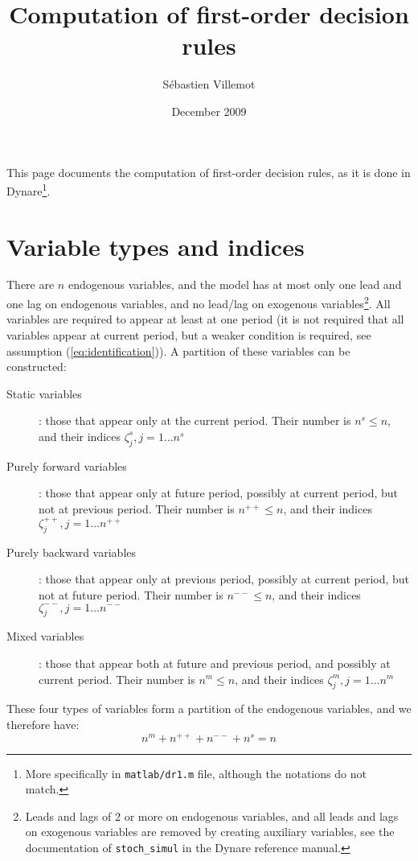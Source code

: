 \documentclass[11pt,a4paper]{article}
\begin{document}
\author{S\'ebastien Villemot}
\title{Computation of first-order decision rules}
\date{December 2009}
\maketitle

This page documents the computation of first-order decision rules, as it is done in Dynare\footnote{More specifically in \texttt{matlab/dr1.m} file, although the notations do not match.}.

\section{Variable types and indices}

There are $n$ endogenous variables, and the model has at most only one lead and one lag on endogenous variables, and no lead/lag on exogenous variables\footnote{Leads and lags of 2 or more on endogenous variables, and all leads and lags on exogenous variables are removed by creating auxiliary variables, see the documentation of \texttt{stoch\_simul} in the Dynare reference manual.}. All variables are required to appear at least at one period (it is not required that all variables appear at current period, but a weaker condition is required, see assumption (\ref{eq:identification})). A partition of these variables can be constructed:
\begin{description}
\item[Static variables]: those that appear only at the current period. Their number is $n^s \leq n$, and their indices $\zeta^s_j, j=1\ldots n^s$
\item[Purely forward variables]: those that appear only at future period, possibly at current period, but not at previous period. Their number is $n^{++} \leq n$, and their indices $\zeta^{++}_j, j=1\ldots n^{++}$
\item[Purely backward variables]: those that appear only at previous period, possibly at current period, but not at future period.  Their number is $n^{--} \leq n$, and their indices $\zeta^{--}_j, j=1\ldots n^{--}$
\item[Mixed variables]: those that appear both at future and previous period, and possibly at current period.  Their number is $n^m \leq n$, and their indices $\zeta^m_j, j=1\ldots n^m$
\end{description}

These four types of variables form a partition of the endogenous variables, and we therefore have:
\begin{equation*}
  n^m + n^{++} + n^{--} + n^s = n
\end{equation*}
\end{document}
